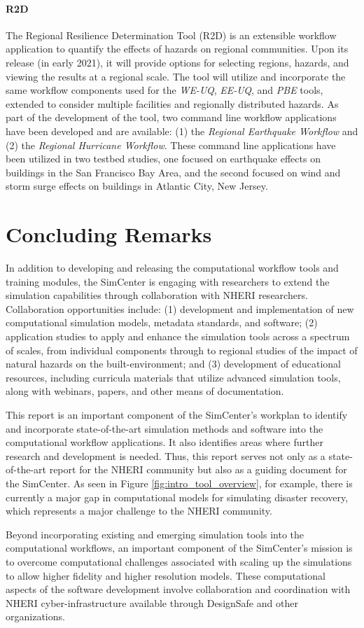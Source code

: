 \paragraph{R2D} The Regional Resilience Determination Tool (R2D) is an extensible workflow application to quantify the effects of hazards on regional communities. Upon its release (in early 2021), it will provide options for selecting regions, hazards, and viewing the results at a regional scale. The tool will utilize and incorporate the same workflow components used for the \emph{WE-UQ}, \emph{EE-UQ}, and \emph{PBE} tools, extended to consider multiple facilities and regionally distributed hazards. As part of the development of the tool, two command line workflow applications have been developed and are available: (1) the \emph{Regional Earthquake Workflow} and (2) the \emph{Regional Hurricane Workflow}.  These command line  applications have been utilized in two testbed studies, one focused on earthquake effects on buildings in the San Francisco Bay Area, and the second focused on wind and storm surge effects on buildings in Atlantic City, New Jersey.

\section{Concluding Remarks}

In addition to developing and releasing the computational workflow tools and training modules, the SimCenter is engaging with researchers to extend the simulation capabilities through collaboration with NHERI researchers. Collaboration opportunities include: (1) development and implementation of new computational simulation models, metadata standards, and software; (2) application studies to apply and enhance the simulation tools across a spectrum of scales, from individual components through to regional studies of the impact of natural hazards on the built-environment; and (3) development of educational resources, including curricula materials that utilize advanced simulation tools, along with webinars, papers, and other means of documentation. 

This report is an important component of the SimCenter’s workplan to identify and incorporate state-of-the-art simulation methods and software into the computational workflow applications. It also identifies areas where further research and development is needed.  Thus, this report serves not only as a state-of-the-art report for the NHERI community but also as a guiding document for the SimCenter.  As seen in Figure \ref{fig:intro_tool_overview}, for example, there is currently a major gap in computational models for simulating disaster recovery, which represents a major challenge to the NHERI community. 

Beyond incorporating existing and emerging simulation tools into the computational workflows, an important component of the SimCenter’s mission is to overcome computational challenges associated with scaling up the simulations to allow higher fidelity and higher resolution models.  These computational aspects of the software development involve collaboration and coordination with NHERI cyber-infrastructure available through DesignSafe and other organizations. 